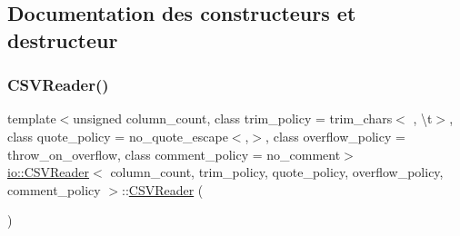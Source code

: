 \subsection{Documentation des constructeurs et destructeur}
\mbox{\label{classio_1_1CSVReader_abb95a0607cd9a32231daf62f8fc841ab}} 
\subsubsection{\texorpdfstring{C\+S\+V\+Reader()}{CSVReader()}\hspace{0.1cm}{\footnotesize\ttfamily [1/3]}}
{\footnotesize\ttfamily template$<$unsigned column\+\_\+count, class trim\+\_\+policy  = trim\+\_\+chars$<$\textquotesingle{} \textquotesingle{}, \textquotesingle{}\textbackslash{}t\textquotesingle{}$>$, class quote\+\_\+policy  = no\+\_\+quote\+\_\+escape$<$\textquotesingle{},\textquotesingle{}$>$, class overflow\+\_\+policy  = throw\+\_\+on\+\_\+overflow, class comment\+\_\+policy  = no\+\_\+comment$>$ \\
\hyperlink{classio_1_1CSVReader}{io\+::\+C\+S\+V\+Reader}$<$ column\+\_\+count, trim\+\_\+policy, quote\+\_\+policy, overflow\+\_\+policy, comment\+\_\+policy $>$\+::\hyperlink{classio_1_1CSVReader}{C\+S\+V\+Reader} (\begin{DoxyParamCaption}{ }\end{DoxyParamCaption})\hspace{0.3cm}{\ttfamily [delete]}}

\mbox{\label{classio_1_1CSVReader_a0507ac5abe201969a15df76795e13c28}} 
